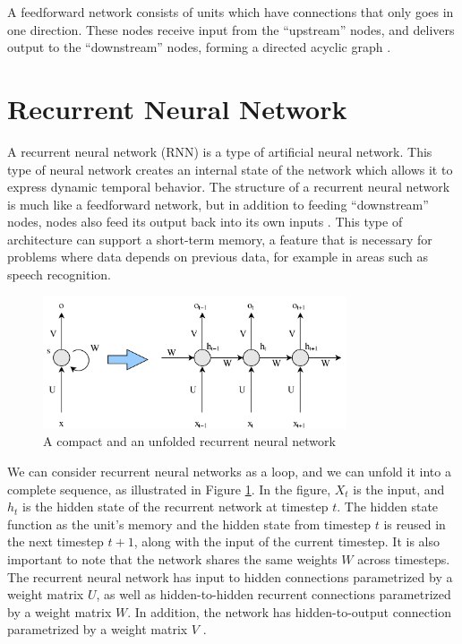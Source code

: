 A feedforward network consists of units which have connections that only goes in one direction. These nodes receive input from the ``upstream'' nodes, and delivers output to the ``downstream'' nodes, forming a directed acyclic graph \citep[pp.~728--729]{russell2010aimodernapproach}.


\section{Recurrent Neural Network}
\label{sec:reccurent_neural_network}
A recurrent neural network (RNN) is a type of artificial neural network. This type of neural network creates an internal state of the network which allows it to express dynamic temporal behavior. The structure of a recurrent neural network is much like a feedforward network, but in addition to feeding ``downstream'' nodes, nodes also feed its output back into its own inputs \citep[pp.~729]{russell2010aimodernapproach}. This type of architecture can support a short-term memory, a feature that is necessary for problems where data depends on previous data, for example in areas such as speech recognition.

\begin{figure}[h]
    \centering
    \includegraphics[width=0.8\textwidth]{fig/related_work/nn_recurrent.png}
    \caption{A compact and an unfolded recurrent neural network}
    \label{fig:nn-rnn}
\end{figure}

We can consider recurrent neural networks as a loop, and we can unfold it into a complete sequence, as illustrated in Figure \ref{fig:nn-rnn}. In the figure, \(X_{t}\) is the input, and \(h_{t}\) is the hidden state of the recurrent network at timestep \(t\). The hidden state function as the unit's memory and the hidden state from timestep \(t\) is reused in the next timestep \(t+1\), along with the input of the current timestep. It is also important to note that the network shares the same weights \(W\) across timesteps. The recurrent neural network has input to hidden connections parametrized by a weight matrix \(U\), as well as hidden-to-hidden recurrent connections parametrized by a weight matrix \(W\). In addition, the network has hidden-to-output connection parametrized by a weight matrix \(V\) \citep[pp.~378--379]{goodfellow2016deeplearning}.

